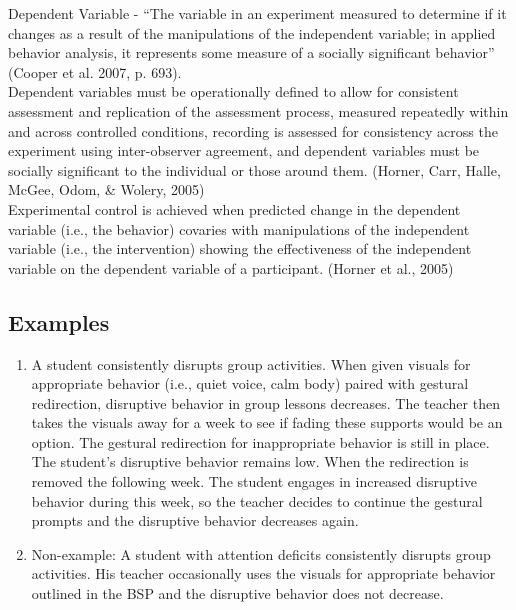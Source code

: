 Dependent Variable - ``The variable in an experiment measured to determine if it changes as a result of the manipulations of the independent variable; in applied behavior analysis, it represents some measure of a socially significant behavior'' (Cooper et al. 2007, p. 693).\\

Dependent variables must be operationally defined to allow for consistent assessment and replication of the assessment process, measured repeatedly within and across controlled conditions, recording is assessed for consistency across the experiment using inter-observer agreement, and dependent variables must be socially significant to the individual or those around them. (Horner, Carr, Halle, McGee, Odom, \& Wolery, 2005)\\

Experimental control is achieved when predicted change in the dependent variable (i.e., the behavior) covaries with manipulations of the independent variable (i.e., the intervention) showing the effectiveness of the independent variable on the dependent variable of a participant. (Horner et al., 2005)
%
\subsection{Examples} 
\begin{enumerate}
\item   A student consistently disrupts group activities. When given visuals for appropriate behavior (i.e., quiet voice, calm body) paired with gestural redirection, disruptive behavior in group lessons decreases. The teacher then takes the visuals away for a week to see if fading these supports would be an option. The gestural redirection for inappropriate behavior is still in place. The student's disruptive behavior remains low. When the redirection is removed the following week. The student engages in increased disruptive behavior during this week, so the teacher decides to continue the gestural prompts and the disruptive behavior decreases again. 
\item Non-example: A student with attention deficits consistently disrupts group activities. His teacher occasionally uses the visuals for appropriate behavior outlined in the BSP and the disruptive behavior does not decrease.
\end{enumerate}

